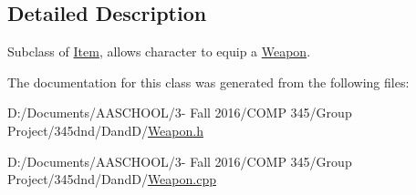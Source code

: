 \subsection{Detailed Description}
Subclass of \hyperlink{class_item}{Item}, allows character to equip a \hyperlink{class_weapon}{Weapon}. 

The documentation for this class was generated from the following files\+:\begin{DoxyCompactItemize}
\item 
D\+:/\+Documents/\+A\+A\+S\+C\+H\+O\+O\+L/3-\/ Fall 2016/\+C\+O\+M\+P 345/\+Group Project/345dnd/\+Dand\+D/\hyperlink{_weapon_8h}{Weapon.\+h}\item 
D\+:/\+Documents/\+A\+A\+S\+C\+H\+O\+O\+L/3-\/ Fall 2016/\+C\+O\+M\+P 345/\+Group Project/345dnd/\+Dand\+D/\hyperlink{_weapon_8cpp}{Weapon.\+cpp}\end{DoxyCompactItemize}
